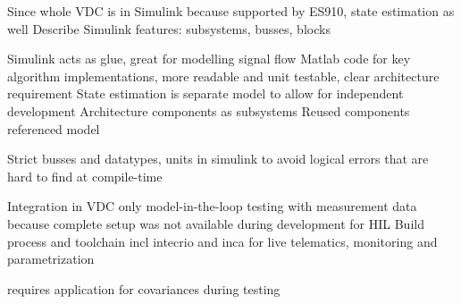 Since whole VDC is in Simulink because supported by ES910, state estimation as well
Describe Simulink features: subsystems, busses, blocks

Simulink acts as glue, great for modelling signal flow
Matlab code for key algorithm implementations, more readable and unit testable, clear architecture requirement
State estimation is separate model to allow for independent development
Architecture components as subsystems
Reused components referenced model

Strict busses and datatypes, units in simulink to avoid logical errors that are hard to find at compile-time

Integration in VDC
only model-in-the-loop testing with measurement data because complete setup was not available during development for HIL
Build process and toolchain incl intecrio and inca for live telematics, monitoring and parametrization

requires application for covariances during testing
